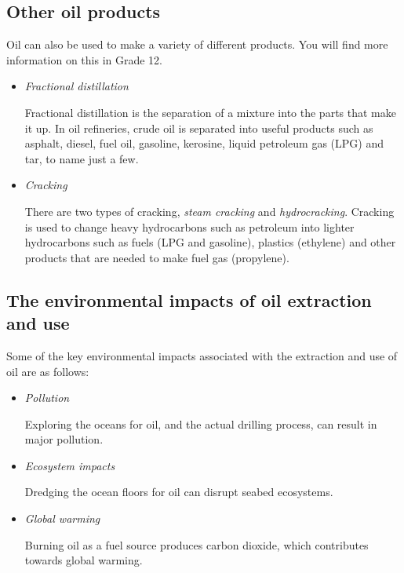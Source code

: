 \subsection{Other oil products}

Oil can also be used to make a variety of different products. You will find more information on this in Grade 12.

\begin{itemize}
\item{\textit{Fractional distillation}

Fractional distillation is the separation of a mixture into the parts that make it up. In oil refineries, crude oil is separated into useful products such as asphalt, diesel, fuel oil, gasoline, kerosine, liquid petroleum gas (LPG) and tar, to name just a few.
}

\item{\textit{Cracking}

There are two types of cracking, \textit{steam cracking} and \textit{hydrocracking}. Cracking is used to change heavy hydrocarbons such as petroleum into lighter hydrocarbons such as fuels (LPG and gasoline), plastics (ethylene) and other products that are needed to make fuel gas (propylene).
}
\end{itemize}

\subsection{The environmental impacts of oil extraction and use}

Some of the key environmental impacts associated with the extraction and use of oil are as follows:

\begin{itemize}
\item{\textit{Pollution}

Exploring the oceans for oil, and the actual drilling process, can result in major pollution.}

\item{\textit{Ecosystem impacts}

Dredging the ocean floors for oil can disrupt seabed ecosystems.
}

\item{\textit{Global warming}

Burning oil as a fuel source produces carbon dioxide, which contributes towards global warming.
}
\end{itemize}





